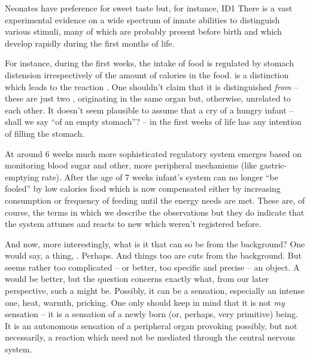 Neonates have preference for sweet taste but, for instance, \citet{weak saline
  solutions are not found aversive, because they have been experienced before
  birth, as aminotic fluid.}{ID1}{} There is a vast experimental
evidence on a wide spectrum of innate abilities to distinguish various stimuli,
many of which are probably present before birth and which develop rapidly during
the first months of life.

For instance, during the first weeks, the intake of food is regulated by stomach
distension irrespectively of the amount of calories in the food.  is a distinction which leads to the reaction . One
shouldn't claim that it is distinguished {\em from}  -- these
are just two , originating in the same organ but, otherwise,
unrelated to each other. It doesn't seem plausible to assume that a cry of a
hungry infant -- shall we say ``of an empty stomach''? -- in the first weeks of
life has any intention of filling the stomach.

At around 6 weeks much more sophisticated regulatory
system emerges based on monitoring blood sugar and other, more peripheral
mechanisms (like gastric-emptying rate). After the age of 7 weeks infant's
system can no longer ``be fooled'' by low calories food which is now compensated
either by increasing consumption or frequency of feeding until the energy needs
are met. These are, of course, the terms in which we describe the observations
but they do indicate that the system attunes and reacts to new 
which weren't registered before.

 
\pa\label{pa:distwhat} And now, more interestingly, what is it that can so be
 from the background? One would say, a thing, . Perhaps. And things too are {cuts} from the background. But
 seems rather too complicated -- or better, too specific
and precise -- an object. A  would be better, but the question
concerns exactly what, from our later perspective, such a  might be.
Possibly, it can be a sensation, especially an intense one, heat, warmth,
pricking. One only should keep in mind that it is not {\em my} sensation -- it
is a sensation of a newly born (or, perhaps, very primitive) being.  It is an
autonomous sensation of a peripheral organ provoking possibly, but not
necessarily, a reaction which need not be mediated through the central nervous
system.


